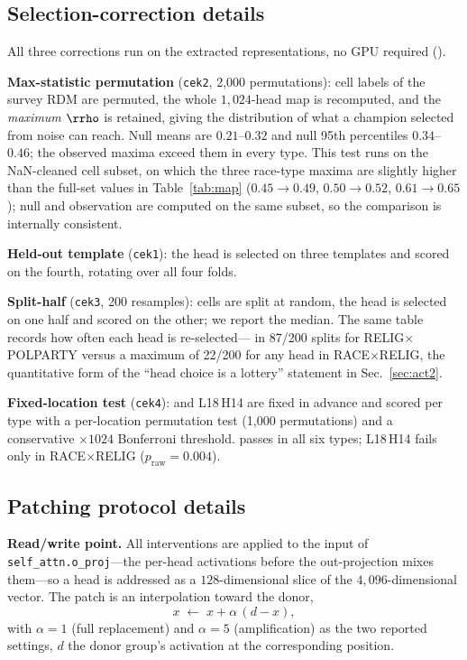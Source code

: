 \subsection{Selection-correction details}
\label{app:selection}
All three corrections run on the extracted representations, no GPU
required ().

\textbf{Max-statistic permutation} (\texttt{cek2}, 2{,}000 permutations):
cell labels of the survey RDM are permuted, the whole $1{,}024$-head map
is recomputed, and the \emph{maximum} $\rrho$ is retained, giving the
distribution of what a champion selected from noise can reach. Null
means are $0.21$--$0.32$ and null 95th percentiles $0.34$--$0.46$; the
observed maxima exceed them in every type. This test runs on the
NaN-cleaned cell subset, on which the three race-type maxima are slightly
higher than the full-set values in Table~\ref{tab:map}
($0.45\!\to\!0.49$, $0.50\!\to\!0.52$, $0.61\!\to\!0.65$); null and
observation are computed on the same subset, so the comparison is
internally consistent.

\textbf{Held-out template} (\texttt{cek1}): the head is selected on three
templates and scored on the fourth, rotating over all four folds.

\textbf{Split-half} (\texttt{cek3}, 200 resamples): cells are split at
random, the head is selected on one half and scored on the other; we
report the median. The same table records how often each head is
re-selected---\starhead{} in 87/200 splits for RELIG$\times$POLPARTY
versus a maximum of 22/200 for any head in RACE$\times$RELIG, the
quantitative form of the ``head choice is a lottery'' statement in
Sec.~\ref{sec:act2}.

\textbf{Fixed-location test} (\texttt{cek4}): \starhead{} and L18\,H14
are fixed in advance and scored per type with a per-location permutation
test (1{,}000 permutations) and a conservative $\times1024$ Bonferroni
threshold. \starhead{} passes in all six types; L18\,H14 fails only in
RACE$\times$RELIG ($p_{\text{raw}}=0.004$).

\subsection{Patching protocol details}
\label{app:patching}
\textbf{Read/write point.} All interventions are applied to the input of
\texttt{self\_attn.o\_proj}---the per-head activations before the
out-projection mixes them---so a head is addressed as a $128$-dimensional
slice of the $4{,}096$-dimensional vector. The patch is an interpolation
toward the donor,
\begin{equation}
x \;\leftarrow\; x + \alpha\,(d - x),
\end{equation}
with $\alpha=1$ (full replacement) and $\alpha=5$ (amplification) as the
two reported settings, $d$ the donor group's activation at the
corresponding position.

